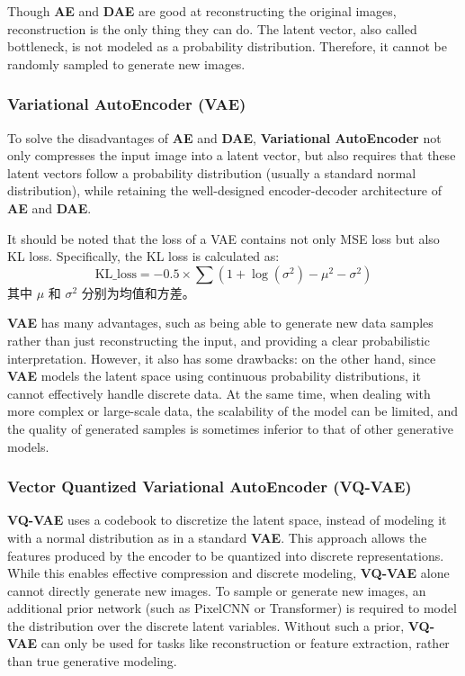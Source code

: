 \documentclass{article}
\begin{document}
Though \textbf{AE} and \textbf{DAE} are good at reconstructing the original images, reconstruction is the 
only thing they can do. The latent vector, also called bottleneck, is not modeled as a probability 
distribution. Therefore, it cannot be randomly sampled to generate new images.

\subsubsection{Variational AutoEncoder (VAE)}

To solve the disadvantages of \textbf{AE} and \textbf{DAE}, \textbf{Variational AutoEncoder} not only 
compresses the input image into a latent vector, but also requires that these latent vectors follow a 
probability distribution (usually a standard normal distribution), while retaining the well-designed 
encoder-decoder architecture of \textbf{AE} and \textbf{DAE}.

It should be noted that the loss of a VAE contains not only MSE loss but also KL loss. Specifically, the KL 
loss is calculated as:
\begin{equation}
\text{KL\_loss} = -0.5 \times \sum \left(1 + \log(\sigma^2) - \mu^2 - \sigma^2\right)
\end{equation}
其中 $\mu$ 和 $\sigma^2$ 分别为均值和方差。

\textbf{VAE} has many advantages, such as being able to generate new data samples rather than just 
reconstructing the input, and providing a clear probabilistic interpretation. However, it also has some 
drawbacks: on the other hand, since \textbf{VAE} models the latent space using continuous probability 
distributions, it cannot effectively handle discrete data. At the same time, when dealing with more complex 
or large-scale data, the scalability of the model can be limited, and the quality of generated samples is 
sometimes inferior to that of other generative models.

\subsubsection{Vector Quantized Variational AutoEncoder (VQ-VAE)}

\textbf{VQ-VAE} uses a codebook to discretize the latent space, instead of modeling it with a normal 
distribution as in a standard \textbf{VAE}. This approach allows the features produced by the encoder to be 
quantized into discrete representations. While this enables effective compression and discrete modeling, 
\textbf{VQ-VAE} alone cannot directly generate new images. To sample or generate new images, an additional 
prior network (such as PixelCNN or Transformer) is required to model the distribution over the discrete 
latent variables. Without such a prior, \textbf{VQ-VAE} can only be used for tasks like reconstruction or 
feature extraction, rather than true generative modeling.
\end{document}
